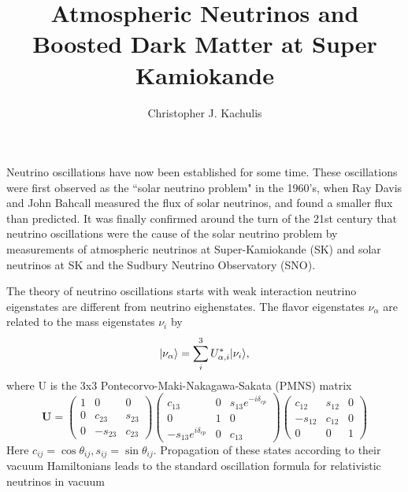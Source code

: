 \documentclass[12pt,oneside,openright]{article}
\begin{document}
\pagestyle{plain}


\setcounter{page}{1}


\title{\bf Atmospheric Neutrinos and Boosted Dark Matter at Super Kamiokande}
\author{Christopher J. Kachulis}
\maketitle

Neutrino oscillations have now been established for some time.  These oscillations were first observed as the ``solar neutrino problem" in the 1960's, when Ray Davis and John Bahcall measured the flux of solar neutrinos, and found a smaller flux than predicted.  It was finally confirmed around the turn of the 21st century that neutrino oscillations were the cause of the solar neutrino problem by measurements of atmospheric neutrinos at Super-Kamiokande (SK) and solar neutrinos at SK and the Sudbury Neutrino Observatory (SNO).  \par
The theory of neutrino oscillations starts with weak interaction neutrino eigenstates are different from neutrino eighenstates.  The flavor eigenstates $\nu_\alpha$ are related to the mass eigenstates $\nu_i$ by
\begin{equation}
\lvert \nu_{\alpha}\rangle=\sum_i^3 U_{\alpha,i}^* \lvert \nu_i\rangle,
\label{eqn:flav-mass}
\end{equation}
where U is the 3x3 Pontecorvo-Maki-Nakagawa-Sakata (PMNS) matrix
\begin{equation}
\textbf{U}=\begin{pmatrix}
1 & 0 & 0\\
0 & c_{23} & s_{23} \\
0 & -s_{23} & c_{23} \end{pmatrix} 
\begin{pmatrix}
c_{13} & 0 & s_{13}e^{-i\delta_{cp}}\\
0 & 1 & 0 \\
-s_{13}e^{i\delta_{cp}} & 0 & c_{13} \end{pmatrix}
\begin{pmatrix}
c_{12} & s_{12} & 0\\
-s_{12} & c_{12} & 0 \\
0 & 0 & 1 \end{pmatrix}
\label{eqn:pmns}
\end{equation}
%
%
Here $c_{ij}=\cos{\theta_{ij}} , s_{ij}=\sin{\theta_{ij}}$.  Propagation of these states according to their vacuum Hamiltonians leads to the standard oscillation formula for relativistic neutrinos in vacuum
\end{document}
